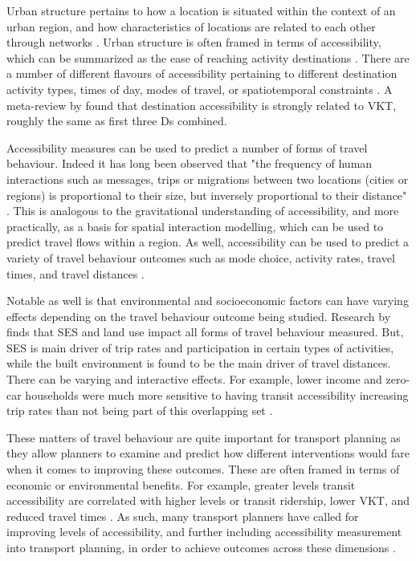 Urban structure pertains to how a location is situated within the context of an urban region, and how characteristics of locations are related to each other through networks \cite{anas_urban_1998}. Urban structure is often framed in terms of accessibility, which can be summarized as the ease of reaching activity destinations \cite{hansen_how_1959,geurs_accessibility_2004}. There are a number of different flavours of accessibility pertaining to different destination activity types, times of day, modes of travel, or spatiotemporal constraints \cite{geurs_accessibility_2004,levinson_towards_2020}. A meta-review by  found that destination accessibility is strongly related to VKT, roughly the same as first three Ds combined. 

Accessibility measures can be used to predict a number of forms of travel behaviour. Indeed it has long been observed that "the frequency of human interactions such as messages, trips or migrations between two locations (cities or regions) is proportional to their size, but inversely proportional to their distance" \cite{wegener_land-use_2004}. This is analogous to the gravitational understanding of accessibility, and more practically, as a basis for spatial interaction modelling, which can be used to predict travel flows within a region. As well, accessibility can be used to predict a variety of travel behaviour outcomes such as mode choice, activity rates, travel times, and travel distances \cite{ewing_travel_2010,koenig_indicators_1980,badoe_transportationland-use_2000}. 

Notable as well is that environmental and socioeconomic factors can have varying effects depending on the travel behaviour outcome being studied. Research by  finds that SES and land use impact all forms of travel behaviour measured. But, SES is main driver of trip rates and participation in certain types of activities, while the built environment is found to be the main driver of travel distances. There can be varying and interactive effects. For example, lower income and zero-car households were much more sensitive to having transit accessibility increasing trip rates than not being part of this overlapping set \cite{allen_planning_2020}.

These matters of travel behaviour are quite important for transport planning as they allow planners to examine and predict how different interventions would fare when it comes to improving these outcomes. These are often framed in terms of economic or environmental benefits. For example, greater levels transit accessibility are correlated with higher levels or transit ridership, lower VKT, and reduced travel times \cite{badoe_transportationland-use_2000,ewing_travel_2010}. As such, many transport planners have called for improving levels of accessibility, and further including accessibility measurement into transport planning, in order to achieve outcomes across these dimensions \cite{handy_measuring_1997}.

